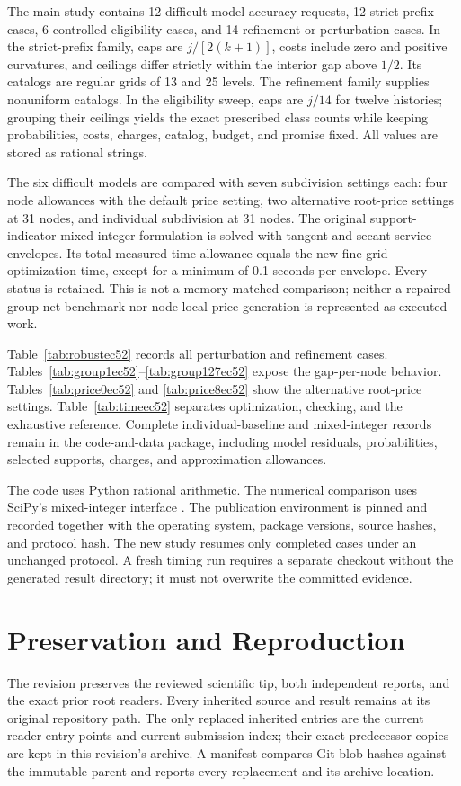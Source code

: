 The main study contains 12 difficult-model accuracy requests, 12 strict-prefix cases, 6 controlled eligibility cases, and 14 refinement or perturbation cases. In the strict-prefix family, caps are $j/[2(k+1)]$, costs include zero and positive curvatures, and ceilings differ strictly within the interior gap above $1/2$. Its catalogs are regular grids of 13 and 25 levels. The refinement family supplies nonuniform catalogs. In the eligibility sweep, caps are $j/14$ for twelve histories; grouping their ceilings yields the exact prescribed class counts while keeping probabilities, costs, charges, catalog, budget, and promise fixed. All values are stored as rational strings.

The six difficult models are compared with seven subdivision settings each: four node allowances with the default price setting, two alternative root-price settings at 31 nodes, and individual subdivision at 31 nodes. The original support-indicator mixed-integer formulation is solved with tangent and secant service envelopes. Its total measured time allowance equals the new fine-grid optimization time, except for a minimum of 0.1 seconds per envelope. Every status is retained. This is not a memory-matched comparison; neither a repaired group-net benchmark nor node-local price generation is represented as executed work.

Table~\ref{tab:robustec52} records all perturbation and refinement cases. Tables~\ref{tab:group1ec52}--\ref{tab:group127ec52} expose the gap-per-node behavior. Tables~\ref{tab:price0ec52} and \ref{tab:price8ec52} show the alternative root-price settings. Table~\ref{tab:timeec52} separates optimization, checking, and the exhaustive reference. Complete individual-baseline and mixed-integer records remain in the code-and-data package, including model residuals, probabilities, selected supports, charges, and approximation allowances.

The code uses Python rational arithmetic. The numerical comparison uses SciPy's mixed-integer interface \citep{Virtanen2020}. The publication environment is pinned and recorded together with the operating system, package versions, source hashes, and protocol hash. The new study resumes only completed cases under an unchanged protocol. A fresh timing run requires a separate checkout without the generated result directory; it must not overwrite the committed evidence.

\section{Preservation and Reproduction}\label{sec:preserveec52}
The revision preserves the reviewed scientific tip, both independent reports, and the exact prior root readers. Every inherited source and result remains at its original repository path. The only replaced inherited entries are the current reader entry points and current submission index; their exact predecessor copies are kept in this revision's archive. A manifest compares Git blob hashes against the immutable parent and reports every replacement and its archive location.

